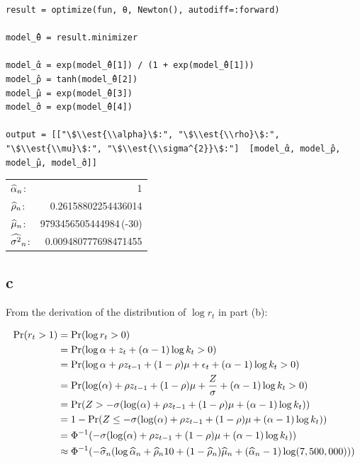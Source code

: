 \documentclass[12pt, letterpaper]{paper}
\begin{document}
\begin{verbatim}
result = optimize(fun, θ, Newton(), autodiff=:forward)

model_̂θ = result.minimizer

model_̂α = exp(model_̂θ[1]) / (1 + exp(model_̂θ[1]))
model_̂ρ = tanh(model_̂θ[2])
model_̂μ = exp(model_̂θ[3])
model_̂σ = exp(model_̂θ[4])

output = [["\$\\est{\\alpha}\$:", "\$\\est{\\rho}\$:", "\$\\est{\\mu}\$:", "\$\\est{\\sigma^{2}}\$:"]  [model_̂α, model_̂ρ, model_̂μ, model_̂σ]]
\end{verbatim}

\begin{center}
\begin{tabular}{lr}
\(\widehat{ \alpha }_{n}\): & 1\\
\(\widehat{ \rho }_{n}\): & 0.26158802254436014\\
\(\widehat{ \mu }_{n}\): & 9793456505444984\,(-30)\\
\(\widehat{ \sigma^{2} }_{n}\): & 0.009480777698471455\\
\end{tabular}
\end{center}

\subsection{c}
\label{sec:org9113740}
From the derivation of the distribution of $\log r_t$ in part (b):

\begin{align*}
    \Pr( r_t > 1) &= \Pr( \log r_t > 0)\\
                  &= \Pr( \log \alpha + z_t + (\alpha - 1)\log k_t > 0)\\
                  &= \Pr( \log \alpha + \rho z_{t-1} + (1 - \rho)\mu + \epsilon_t + (\alpha-1) \log k_t > 0)\\
    &= \Pr( \log(\alpha) + \rho z_{t-1} + (1-\rho)\mu + \frac{Z}{\sigma} + (\alpha-1) \log k_t
      > 0)\\
                  &= \Pr( Z > - \sigma ( \log(\alpha) + \rho z_{t-1} + (1-\rho)\mu + (\alpha-1)\log k_t))\\
    &= 1 - \Pr( Z \leq - \sigma ( \log(\alpha) + \rho z_{t-1} + (1-\rho)\mu + (\alpha-1)\log
      k_t))\\
                  &= { \Phi}^{-1}( - \sigma ( \log(\alpha) + \rho z_{t-1} + (1-\rho)\mu + (\alpha-1)\log k_t ))\\
    &\approx {\Phi}^{-1}( -\widehat{ \sigma }_{n} ( \log \widehat{ \alpha }_{n} + \widehat{ \rho }_{n}10 + (1-\widehat{ \rho }_{n})
      \widehat{ \mu }_{n} + (\widehat{ \alpha }_{n} - 1) \log( 7,500,000) ))\\
  \end{align*}
\end{document}

